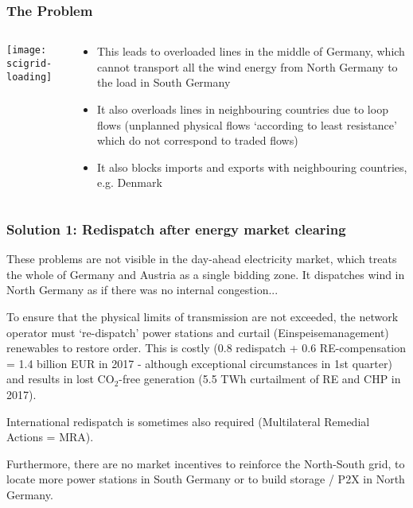 \documentclass[10pt,dvipsnames]{beamer}
\let\olditem\item
\renewcommand{\item}{%
\olditem\vspace{5pt}}
\begin{document}
\begin{frame}
  \frametitle{The Problem}



\begin{columns}[T]
  \begin{column}{5.5cm}
        \vspace{.5cm}
\texttt{[image: scigrid-loading]}
  \end{column}

  \begin{column}{6cm}
    \begin{itemize}
      \item This leads to \alert{overloaded lines} in the middle of Germany, which
   cannot transport all the wind energy from North Germany to the load
   in South Germany

   \item It also overloads lines in neighbouring countries due to
     \alert{loop flows} (unplanned physical flows `according to least
     resistance' which do not correspond to traded flows)

     \item It also \alert{blocks imports and exports} with
       neighbouring countries, e.g. Denmark

    \end{itemize}

\end{column}
\end{columns}

\end{frame}

\begin{frame}
  \frametitle{Solution 1: Redispatch after energy market clearing}

  These problems are \alert{not visible} in the day-ahead electricity
  market, which treats the whole of Germany and Austria as a single
  bidding zone. It dispatches wind in North Germany as if there was no
  internal congestion...

  To ensure that the physical limits of transmission are not exceeded,
  the network operator must \alert{`re-dispatch'} power stations and
  \alert{curtail} (Einspeisemanagement) renewables to restore order.
  This is \alert{costly} (0.8 redispatch + 0.6 RE-compensation = 1.4 billion
  EUR in 2017 - although exceptional circumstances in 1st quarter) and
  results in \alert{lost CO$_2$-free generation} (5.5 TWh curtailment of RE
  and CHP in 2017).

  \alert{International redispatch} is sometimes also required
  (Multilateral Remedial Actions = MRA).

  Furthermore, there are \alert{no market incentives} to reinforce the North-South
  grid, to locate more power stations in South Germany or to
  build storage / P2X in North Germany.

\end{frame}
\end{document}
